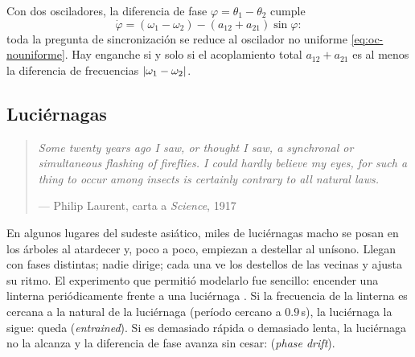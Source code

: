 Con dos osciladores, la diferencia de fase $\varphi=\theta_1-\theta_2$ cumple
\begin{equation}
  \dot\varphi=(\omega_1-\omega_2)-(a_{12}+a_{21})\sin\varphi :
  \label{eq:oc-dos}
\end{equation}
toda la pregunta de sincronización se reduce al oscilador no uniforme \eqref{eq:oc-nouniforme}. Hay enganche si y solo si el acoplamiento total $a_{12}+a_{21}$ es al menos la diferencia de frecuencias $\left\lvert \omega_1-\omega_2\right\rvert$.

\subsection{Luciérnagas}

\begin{quote}\small\itshape
Some twenty years ago I saw, or thought I saw, a synchronal or simultaneous flashing of fireflies. I could hardly believe my eyes, for such a thing to occur among insects is certainly contrary to all natural laws.
\par\hfill\normalfont--- Philip Laurent, carta a \emph{Science}, 1917 \citep{Lau17}
\end{quote}

En algunos lugares del sudeste asiático, miles de luciérnagas macho se posan en los árboles al atardecer y, poco a poco, empiezan a destellar al unísono. Llegan con fases distintas; nadie dirige; cada una ve los destellos de las vecinas y ajusta su ritmo. El experimento que permitió modelarlo fue sencillo: encender una linterna periódicamente frente a una luciérnaga \citep{Han78}. Si la frecuencia de la linterna es cercana a la natural de la luciérnaga (período cercano a $0.9$\,s), la luciérnaga la sigue: queda  (\emph{entrained}). Si es demasiado rápida o demasiado lenta, la luciérnaga no la alcanza y la diferencia de fase avanza sin cesar:  (\emph{phase drift}).

